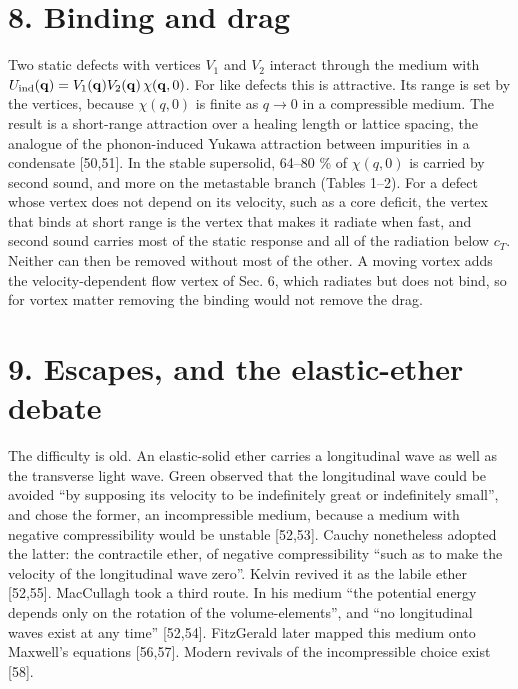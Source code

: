 \documentclass[
  11pt,
]{article}
\begin{document}
\hypertarget{binding-and-drag}{%
\section{8. Binding and drag}\label{binding-and-drag}}

Two static defects with vertices \(V_1\) and \(V_2\) interact through
the medium with
\(U_{\rm ind}(\mathbf q)=V_1(\mathbf q)V_2(\mathbf q)\,\chi(\mathbf q,0)\).
For like defects this is attractive. Its range is set by the vertices,
because \(\chi(q,0)\) is finite as \(q\to0\) in a compressible medium.
The result is a short-range attraction over a healing length or lattice
spacing, the analogue of the phonon-induced Yukawa attraction between
impurities in a condensate {[}50,51{]}. In the stable supersolid, 64--80
\% of \(\chi(q,0)\) is carried by second sound, and more on the
metastable branch (Tables 1--2). For a defect whose vertex does not
depend on its velocity, such as a core deficit, the vertex that binds at
short range is the vertex that makes it radiate when fast, and second
sound carries most of the static response and all of the radiation below
\(c_T\). Neither can then be removed without most of the other. A moving
vortex adds the velocity-dependent flow vertex of Sec. 6, which radiates
but does not bind, so for vortex matter removing the binding would not
remove the drag.

\hypertarget{escapes-and-the-elastic-ether-debate}{%
\section{9. Escapes, and the elastic-ether
debate}\label{escapes-and-the-elastic-ether-debate}}

The difficulty is old. An elastic-solid ether carries a longitudinal
wave as well as the transverse light wave. Green observed that the
longitudinal wave could be avoided ``by supposing its velocity to be
indefinitely great or indefinitely small'', and chose the former, an
incompressible medium, because a medium with negative compressibility
would be unstable {[}52,53{]}. Cauchy nonetheless adopted the latter:
the contractile ether, of negative compressibility ``such as to make the
velocity of the longitudinal wave zero''. Kelvin revived it as the
labile ether {[}52,55{]}. MacCullagh took a third route. In his medium
``the potential energy depends only on the rotation of the
volume-elements'', and ``no longitudinal waves exist at any time''
{[}52,54{]}. FitzGerald later mapped this medium onto Maxwell's
equations {[}56,57{]}. Modern revivals of the incompressible choice
exist {[}58{]}.
\end{document}
